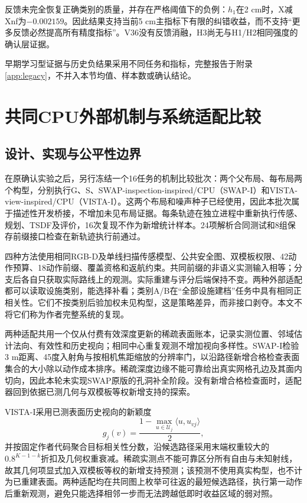 \documentclass[11pt,a4paper]{article}
\begin{document}
反馈未完全恢复正确类别的质量，并存在严格阈值下的负例：$h_1$在2 cm时，X减Xnf为$-0.002159$。因此结果支持当前5 cm主指标下有限的纠错收益，而不支持“更多反馈必然提高所有精度指标”。V36没有反馈消融，H3尚无与H1/H2相同强度的确认层证据。

早期学习型证据与历史负结果采用不同任务和指标，完整报告于附录\ref{app:legacy}，不并入本节均值、样本数或确认结论。

\section{共同CPU外部机制与系统适配比较}
\label{sec:external}
\subsection{设计、实现与公平性边界}
在原确认实验之后，另行冻结一个16任务的机制比较批次：两个父布局、每布局两个构型，分别执行G、S、SWAP-inspection-inspired/CPU（SWAP-I）和VISTA-view-inspired/CPU（VISTA-I）。这两个布局和噪声种子已经使用，因此本批次属于描述性开发桥接，不增加未见布局证据。每条轨迹在独立进程中重新执行传感、规划、TSDF及评价，16次复现不作为新增统计样本。24项解析合同测试和8组保存前缀接口检查在新轨迹执行前通过。

四种方法使用相同RGB-D及单线扫描传感模型、公共安全图、双模板权限、42动作预算、18动作前缀、覆盖资格和返航约束。共同前缀的非语义实测输入相等；分支后各自只获取实际路线上的观测。实际重建与评分后端保持不变。两种外部适配都可以读取设施类别，能选择补看；类别A/B在“全部设施建档”任务中具有相同正相关性。它们不按类别后验加权未见构型，这是策略差异，而非接口剥夺。本文不将它们称为作者完整系统的复现。

两种适配共用一个仅从付费有效深度更新的稀疏表面账本，记录实测位置、邻域估计法向、有效性和历史视向；相同中心重复观测不增加视向多样性。SWAP-I检验3 m距离、45度入射角与按相机焦距缩放的分辨率门，以沿路径新增合格检查表面集合的大小除以动作成本排序。稀疏深度边缘不能可靠给出真实网格孔边及其面内切向，因此本轮未实现SWAP原版的孔洞补全阶段。没有新增合格检查面时，适配器回到依据已测几何与双模板等权新增支持的探索。

VISTA-I采用已测表面历史视向的新颖度
\begin{equation}
g_j(v)=\frac{1-\max_{u\in\mathcal U_j}\langle u,u_{vj}\rangle}{2},
\end{equation}
并按固定作者代码聚合目标相关性分数，沿候选路径采用末端权重较大的$0.8^{K-1-k}$折扣及几何权重衰减。稀疏实测点不能可靠区分所有自由与未知射线，故其几何项显式加入双模板等权的新增支持预测；该预测不使用真实构型，也不计为已重建表面。两种适配均在共同图上枚举可往返的最短候选路径，执行第一动作后重新观测，避免只能选择相邻一步而无法跨越低即时收益区域的弱对照。
\end{document}
